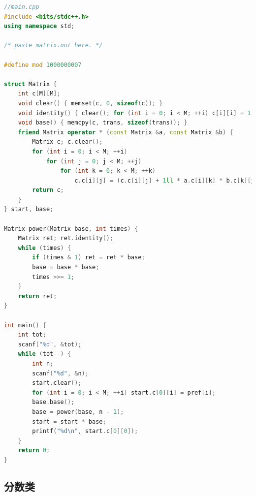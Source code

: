 \documentclass{article}
\begin{document}
\begin{lstlisting}[language=C++]
//main.cpp
#include <bits/stdc++.h>
using namespace std;

/* paste matrix.out here. */

#define mod 1000000007

struct Matrix {
    int c[M][M];
    void clear() { memset(c, 0, sizeof(c)); }
    void identity() { clear(); for (int i = 0; i < M; ++i) c[i][i] = 1; }
    void base() { memcpy(c, trans, sizeof(trans)); }
    friend Matrix operator * (const Matrix &a, const Matrix &b) {
        Matrix c; c.clear();
        for (int i = 0; i < M; ++i)
            for (int j = 0; j < M; ++j)
                for (int k = 0; k < M; ++k)
                    c.c[i][j] = (c.c[i][j] + 1ll * a.c[i][k] * b.c[k][j] % mod) % mod;
        return c;
    }
} start, base;

Matrix power(Matrix base, int times) {
    Matrix ret; ret.identity();
    while (times) {
        if (times & 1) ret = ret * base;
        base = base * base;
        times >>= 1;
    }
    return ret;
}

int main() {
    int tot;
    scanf("%d", &tot);
    while (tot--) {
        int n;
        scanf("%d", &n);
        start.clear();
        for (int i = 0; i < M; ++i) start.c[0][i] = pref[i];
        base.base();
        base = power(base, n - 1);
        start = start * base;
        printf("%d\n", start.c[0][0]);
    }
    return 0;
}
\end{lstlisting}

\subsection{分数类}
\end{document}

